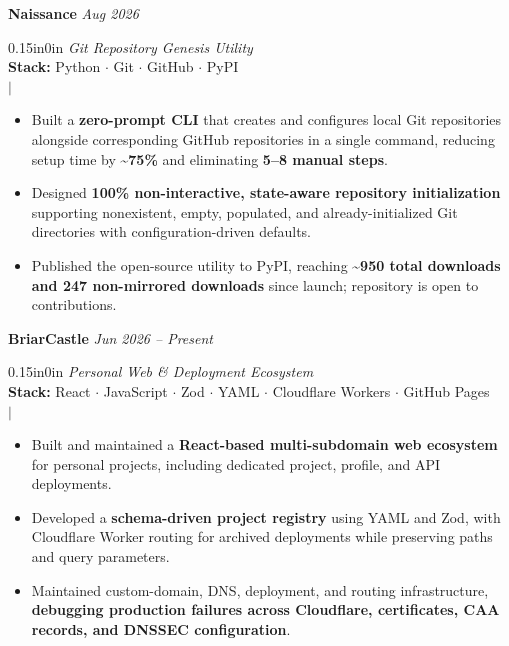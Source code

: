 \noindent
{\large \textbf{Naissance}} \hfill {\small \textit{Aug 2026}}
\begin{adjustwidth}{0.15in}{0in}
    \textit{Git Repository Genesis Utility} \\
    \textbf{Stack:} Python $\cdot$ Git $\cdot$ GitHub $\cdot$ PyPI \\[2pt]
     $|$ 
    \begin{itemize}[leftmargin=0.15in, label={--}]
        \setlength\itemsep{0em}
        \item Built a \textbf{zero-prompt CLI} that creates and configures local Git repositories alongside corresponding GitHub repositories in a single command, reducing setup time by \textbf{\textasciitilde75\%} and eliminating \textbf{5--8 manual steps}.
        \item Designed \textbf{100\% non-interactive, state-aware repository initialization} supporting nonexistent, empty, populated, and already-initialized Git directories with configuration-driven defaults.
        \item Published the open-source utility to PyPI, reaching \textbf{\textasciitilde950 total downloads and 247 non-mirrored downloads} since launch; repository is open to contributions.
    \end{itemize}
\end{adjustwidth}

\vspace{10pt}

\noindent
{\large \textbf{BriarCastle}} \hfill {\small \textit{Jun 2026 -- Present}}
\begin{adjustwidth}{0.15in}{0in}
    \textit{Personal Web \& Deployment Ecosystem} \\
    \textbf{Stack:} React $\cdot$ JavaScript $\cdot$ Zod $\cdot$ YAML $\cdot$ Cloudflare Workers $\cdot$ GitHub Pages \\[2pt]
     $|$ 
    \begin{itemize}[leftmargin=0.15in, label={--}]
        \setlength\itemsep{0em}
        \item Built and maintained a \textbf{React-based multi-subdomain web ecosystem} for personal projects, including dedicated project, profile, and API deployments.
        \item Developed a \textbf{schema-driven project registry} using YAML and Zod, with Cloudflare Worker routing for archived deployments while preserving paths and query parameters.
        \item Maintained custom-domain, DNS, deployment, and routing infrastructure, \textbf{debugging production failures across Cloudflare, certificates, CAA records, and DNSSEC configuration}.
    \end{itemize}
\end{adjustwidth}
